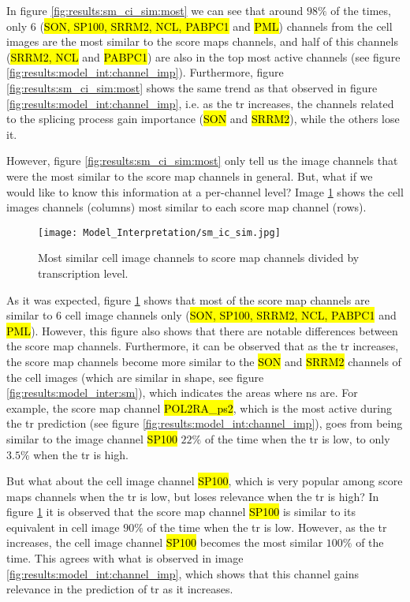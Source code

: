 In figure \ref{fig:results:sm_ci_sim:most} we can see that around $98\%$ of the times, only 6 (\hl{SON, SP100, SRRM2, NCL, PABPC1} and \hl{PML}) channels from the cell images are the most similar to the score maps channels, and half of this channels (\hl{SRRM2, NCL} and \hl{PABPC1}) are also in the top most active channels (see figure \ref{fig:results:model_int:channel_imp}).
Furthermore, figure \ref{fig:results:sm_ci_sim:most} shows the same trend as that observed in figure \ref{fig:results:model_int:channel_imp}, i.e. as the \gls{tr} increases, the channels related to the splicing process gain importance (\hl{SON} and \hl{SRRM2}), while the others lose it.

However, figure \ref{fig:results:sm_ci_sim:most} only tell us the image channels that were the most similar to the score map channels in general. But, what if we would like to know this information at a per-channel level?
Image \ref{fig:results:sm_ci_sim:top} shows the cell images channels (columns) most similar to each score map channel (rows).

\begin{figure}[htb]
  \centering
  \texttt{[image: Model\_Interpretation/sm\_ic\_sim.jpg]}
  \caption{Most similar cell image channels to score map channels divided by transcription level.}
  \label{fig:results:sm_ci_sim:top}
\end{figure}

As it was expected, figure \ref{fig:results:sm_ci_sim:top} shows that most of the score map channels are similar to 6 cell image channels only (\hl{SON, SP100, SRRM2, NCL, PABPC1} and \hl{PML}).
However, this figure also shows that there are notable differences between the score map channels. Furthermore, it can be observed that as the \gls{tr} increases, the score map channels become more similar to the \hl{SON} and \hl{SRRM2} channels of the cell images (which are similar in shape, see figure \ref{fig:results:model_inter:sm}), which indicates the areas where \gls{ns} are.
For example, the score map channel \hl{POL2RA\_ps2}, which is the most active during the \gls{tr} prediction (see figure \ref{fig:results:model_int:channel_imp}), goes from being similar to the image channel \hl{SP100} $22\%$ of the time when the \gls{tr} is low, to only $3.5\%$ when the \gls{tr} is high.

But what about the cell image channel \hl{SP100}, which is very popular among score maps channels when the \gls{tr} is low, but loses relevance when the \gls{tr} is high?
In figure \ref{fig:results:sm_ci_sim:top} it is observed that the score map channel \hl{SP100} is similar to its equivalent in cell image $90\%$ of the time when the \gls{tr} is low. However, as the \gls{tr} increases, the cell image channel \hl{SP100} becomes the most similar $100\%$ of the time.
This agrees with what is observed in image \ref{fig:results:model_int:channel_imp}, which shows that this channel gains relevance in the prediction of \gls{tr} as it increases.


